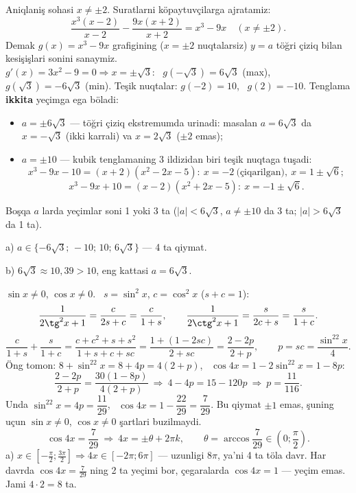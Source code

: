 \newpage
{}
Aniqlaniş sohasi $x\ne\pm2$. Suratlarni köpaytuvçilarga ajratamiz:
\[\frac{x^3(x-2)}{x-2}-\frac{9x(x+2)}{x+2}=x^3-9x\quad(x\ne\pm2).\]
Demak $g(x)=x^3-9x$ grafigining ($x=\pm2$ nuqtalarsiz) $y=a$ töğri çiziq bilan kesişişlari sonini sanaymiz.\\
$g'(x)=3x^2-9=0\Rightarrow x=\pm\sqrt3$: \ $g(-\sqrt3)=6\sqrt3$ (max), \ $g(\sqrt3)=-6\sqrt3$ (min). Teşik nuqtalar: $g(-2)=10$, \ $g(2)=-10$.
Tenglama \textbf{ikkita} yeçimga ega böladi:
\begin{itemize}\setlength{\itemsep}{1pt}
\item $a=\pm6\sqrt3$ — töğri çiziq ekstremumda urinadi: masalan $a=6\sqrt3$ da $x=-\sqrt3$ (ikki karrali) va $x=2\sqrt3$ ($\pm2$ emas);
\item $a=\pm10$ — kubik tenglamaning 3 ildizidan biri teşik nuqtaga tuşadi:
\[x^3-9x-10=(x+2)(x^2-2x-5):\ x=-2\ \text{(çiqarilgan)},\ x=1\pm\sqrt6;\]\[x^3-9x+10=(x-2)(x^2+2x-5):\ x=-1\pm\sqrt6.\]
\end{itemize}
Boşqa $a$ larda yeçimlar soni 1 yoki 3 ta ($|a|<6\sqrt3$, $a\ne\pm10$ da 3 ta; $|a|>6\sqrt3$ da 1 ta).

a) $a\in\{-6\sqrt3;\,-10;\,10;\,6\sqrt3\}$ — 4 ta qiymat.

b) $6\sqrt3\approx10{,}39>10$, eng kattasi $a=6\sqrt3$.

\newpage
{}
$\sin x\ne0$, $\cos x\ne0$. \ $s=\sin^2x$, $c=\cos^2x$ ($s+c=1$):
\[\frac1{2\tg^2x+1}=\frac{c}{2s+c}=\frac c{1+s},\qquad \frac1{2\ctg^2x+1}=\frac s{2c+s}=\frac s{1+c}.\]
\[\frac c{1+s}+\frac s{1+c}=\frac{c+c^2+s+s^2}{1+s+c+sc}=\frac{1+(1-2sc)}{2+sc}=\frac{2-2p}{2+p},\qquad p=sc=\frac{\sin^22x}4.\]
Öng tomon: $8+\sin^22x=8+4p=4(2+p)$, \ $\cos4x=1-2\sin^22x=1-8p$:
\[\frac{2-2p}{2+p}=\frac{30(1-8p)}{4(2+p)}\ \Rightarrow\ 4-4p=15-120p\ \Rightarrow\ p=\frac{11}{116}.\]
Unda $\sin^22x=4p=\dfrac{11}{29}$, \ $\cos4x=1-\dfrac{22}{29}=\dfrac7{29}$. Bu qiymat $\pm1$ emas, şuning uçun $\sin x\ne0$, $\cos x\ne0$ şartlari buzilmaydi.
\[\cos4x=\frac7{29}\ \Rightarrow\ 4x=\pm\theta+2\pi k,\qquad \theta=\arccos\frac7{29}\in\left(0;\frac\pi2\right).\]
a) $x\in\left[-\frac\pi2;\frac{3\pi}2\right]\Rightarrow 4x\in[-2\pi;6\pi]$ — uzunligi $8\pi$, ya'ni 4 ta töla davr. Har davrda $\cos4x=\frac7{29}$ ning 2 ta yeçimi bor, çegaralarda $\cos4x=1$ — yeçim emas. Jami $4\cdot2=8$ ta.

